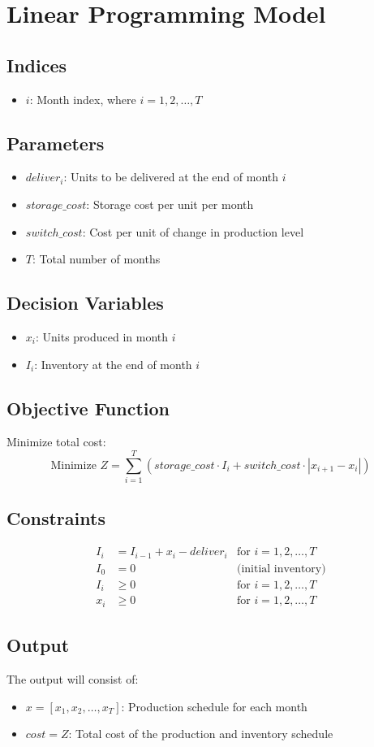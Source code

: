 \documentclass{article}
\begin{document}
\section*{Linear Programming Model}

\subsection*{Indices}
\begin{itemize}
    \item $i$: Month index, where $i = 1, 2, \ldots, T$
\end{itemize}

\subsection*{Parameters}
\begin{itemize}
    \item $deliver_i$: Units to be delivered at the end of month $i$
    \item $storage\_cost$: Storage cost per unit per month
    \item $switch\_cost$: Cost per unit of change in production level
    \item $T$: Total number of months
\end{itemize}

\subsection*{Decision Variables}
\begin{itemize}
    \item $x_i$: Units produced in month $i$
    \item $I_i$: Inventory at the end of month $i$
\end{itemize}

\subsection*{Objective Function}
Minimize total cost:
\[
\text{Minimize } Z = \sum_{i=1}^{T} (storage\_cost \cdot I_i + switch\_cost \cdot |x_{i+1} - x_i|)
\]

\subsection*{Constraints}
\begin{align*}
    I_i & = I_{i-1} + x_i - deliver_i & \text{for } i = 1, 2, \ldots, T \\
    I_0 & = 0 & \text{(initial inventory)} \\
    I_i & \geq 0 & \text{for } i = 1, 2, \ldots, T \\
    x_i & \geq 0 & \text{for } i = 1, 2, \ldots, T
\end{align*}

\subsection*{Output}
The output will consist of:
\begin{itemize}
    \item $x = [x_1, x_2, \ldots, x_T]$: Production schedule for each month
    \item $cost = Z$: Total cost of the production and inventory schedule
\end{itemize}
\end{document}
